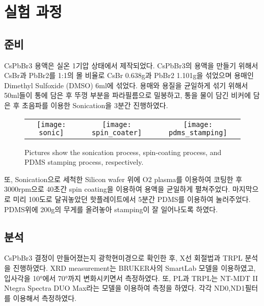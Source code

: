 \section{실험 과정}

\subsection{준비}
CsPbBr3 용액은 실온 1기압 상태에서 제작되었다. CsPbBr3의 용액을 만들기 위해서 CsBr과 PbBr2를 1:1의 몰 비율로 CsBr 0.638g과 PbBr2 1.101g을 섞었으며 용매인 Dimethyl Sulfoxide (DMSO) 6ml에 섞었다. 용매와 용질을 균일하게 섞기 위해서 50ml들이 통에 담은 후 뚜껑 부분을 파라필름으로 밀봉하고, 통을 물이 담긴 비커에 담은 후 초음파를 이용한 Sonication을 3분간 진행하였다. 
\begin{figure}[h!]
	\begin{center}
		\begin{tabular}{ccc}
			\texttt{[image: sonic]} &   \texttt{[image: spin\_coater]} &
			\texttt{[image: pdms\_stamping]}
		\end{tabular}
		\caption{Pictures show the sonication process, spin-coating process, and PDMS stamping process, respectively.}	
		\label{fig:FIR221}
	\end{center}
\end{figure}
또, Sonication으로 세척한 Silicon wafer 위에 O2 plasma를 이용하여 코팅한 후 3000rpm으로 40초간 spin coating을 이용하여 용액을 균일하게 펼쳐주었다. 마지막으로 미리 100도로 달궈놓았던 핫플레이트에서 5분간 PDMS를 이용하여 눌러주었다. PDMS위에 200g의 무게를 올려놓아 stamping이 잘 일어나도록 하였다. 

\subsection{분석}
CsPbBr3 결정이 만들어졌는지 광학현미경으로 확인한 후, X선 회절법과 TRPL 분석을 진행하였다. XRD measurement는 BRUKER사의 SmartLab 모델을 이용하였고, 입사각을 10°에서 70°까지 변화시키면서 측정하였다. 또, PL과 TRPL는 NT-MDT II Ntegra Spectra DUO Max라는 모델을 이용하여 측정을 하였다. 각각 ND0,ND1필터를 이용해서 측정하였다.
